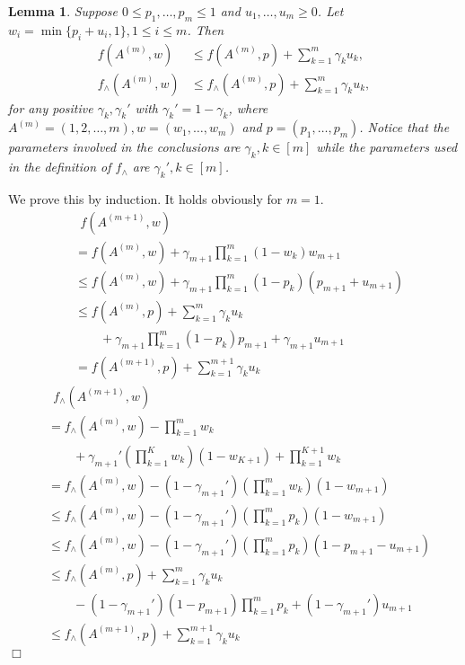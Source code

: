 \documentclass{article}
\newtheorem{lemma}[theorem]{Lemma}%
\newenvironment{proof}{\noindent {\textbf{Proof. }}}{$\Box$ \medskip}
\begin{document}
\begin{lemma}
\label{lem:estimateTech}
Suppose $0 \leq p_1, \ldots, p_m \leq 1$ and $u_1, \ldots, u_m \geq 0$. Let $w_i = \min\{p_i + u_i, 1\}, 1 \leq i \leq m$. Then
\begin{align*}
f(A^{(m)}, w) &\leq f(A^{(m)}, p) + \sum_{k=1}^{m} \gamma_k u_k,\\
f_{\wedge}(A^{(m)}, w) &\leq f_{\wedge}(A^{(m)}, p) + \sum_{k=1}^{m} \gamma_k u_k,
\end{align*}
for any positive $\gamma_k, \gamma_k'$ with $\gamma_k' = 1 - \gamma_k$, where $A^{(m)} = (1, 2, \ldots, m), w = (w_1, \ldots, w_m)$ and $p = (p_1, \ldots, p_m)$. Notice that the parameters involved in the conclusions are $\gamma_k, k \in [m]$ while the parameters used in the definition of $f_{\wedge}$ are $\gamma_k', k \in [m]$.
\end{lemma}
\begin{proof}
We prove this by induction. It holds obviously for $m = 1$.
\begin{align*}
&~~f(A^{(m+1)}, w)\\
&= f(A^{(m)}, w) + \gamma_{m+1}\prod_{k=1}^m(1 - w_k) w_{m+1}\\
&\leq f(A^{(m)}, w) +  \gamma_{m+1} \prod_{k=1}^m(1 - p_k) (p_{m+1} + u_{m+1})\\
&\leq f(A^{(m)}, p) + \sum_{k=1}^m \gamma_k u_k \\
&\qquad + \gamma_{m+1} \prod_{k=1}^m(1 - p_k) p_{m+1} + \gamma_{m+1} u_{m+1}\\
&= f(A^{(m+1)}, p) + \sum_{k=1}^{m+1} \gamma_k u_k
\end{align*}
\begin{align*}
&~~f_{\wedge}(A^{(m+1)}, w) \\
&= f_{\wedge}(A^{(m)}, w) -\prod_{k=1}^{m} w_k \\
&\qquad+ \gamma_{m+1}' (\prod_{k=1}^{K} w_k) (1 - w_{K+1})+ \prod_{k=1}^{K+1} w_k\\
&= f_{\wedge}(A^{(m)}, w) - (1 - \gamma_{m+1}') (\prod_{k=1}^{m} w_k) (1 - w_{m+1})\\
&\leq f_{\wedge}(A^{(m)}, w) - (1 - \gamma_{m+1}') (\prod_{k=1}^{m} p_k) (1 - w_{m+1})\\
&\leq f_{\wedge}(A^{(m)}, w) -(1 - \gamma_{m+1}') (\prod_{k=1}^{m} p_k)  (1 - p_{m+1} - u_{m+1})\\
&\leq f_{\wedge}(A^{(m)}, p) +  \sum_{k=1}^{m} \gamma_k u_k \\
&\qquad - (1 - \gamma_{m+1}') (1 - p_{m+1}) \prod_{k=1}^{m} p_k + (1 - \gamma_{m+1}') u_{m+1}\\
&\leq f_{\wedge}(A^{(m+1)}, p) + \sum_{k=1}^{m+1} \gamma_k u_k
\end{align*}
\end{proof}
\end{document}
